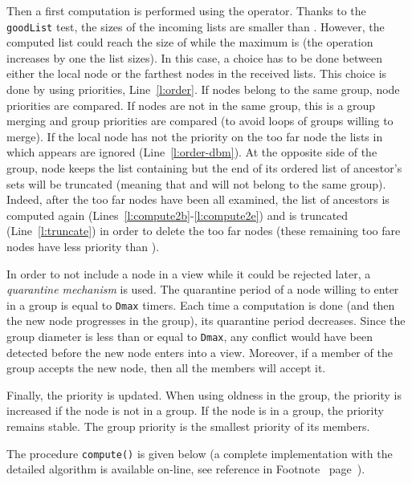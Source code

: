 \documentclass[11pt,english]{article}
\begin{document}
Then a first computation is performed using the  operator. Thanks
to the \texttt{goodList} test, the sizes of the incoming lists are smaller than
.  However, the computed list could reach the size of
 while the maximum is  (the 
operation increases by one the list sizes).
In this case, a choice has to be done between either the local node  or the
farthest nodes in the received lists. This choice is done by using priorities,
Line~\ref{l:order}. If nodes belong to the same group, node priorities are
compared. If nodes are not in the same group, this is a group merging and group
priorities are compared (to avoid loops of groups willing to merge).
If the local node  has not the priority on the too far node 
the lists in which  appears are ignored (Line~\ref{l:order-dbm}).
At the opposite side of the group, node  keeps the list containing  but
the end of its ordered list of ancestor's sets will be truncated (meaning that
 and  will not belong to the same group).
Indeed, after the too far nodes have been all examined, the list of ancestors is
computed again (Lines~\ref{l:compute2b}-\ref{l:compute2e}) and is truncated
(Line~\ref{l:truncate}) in order to delete the too far nodes (these remaining
too fare nodes have less priority than ).

In order to not include a node in a view while it could be rejected later, a
\emph{quarantine mechanism} is used. The quarantine period of a node willing to
enter in a group is equal to \texttt{Dmax} timers. Each time a computation is
done (and then the new node progresses in the group), its quarantine period
decreases. Since the group diameter is less than or equal to \texttt{Dmax}, any
conflict would have been detected before the new node enters into a
view. Moreover, if a member of the group accepts the new node, then all the
members will accept it.

Finally, the priority is updated. When using oldness in the group, the priority
is increased if the node is not in a group. If the node is in a group, the
priority remains stable. The group priority is the smallest priority of its members.

The procedure \texttt{compute()} is given below (a complete implementation with
the detailed algorithm is available on-line, see reference in
Footnote~\pageref{refonline} page~\pageref{refonline}).
\end{document}
